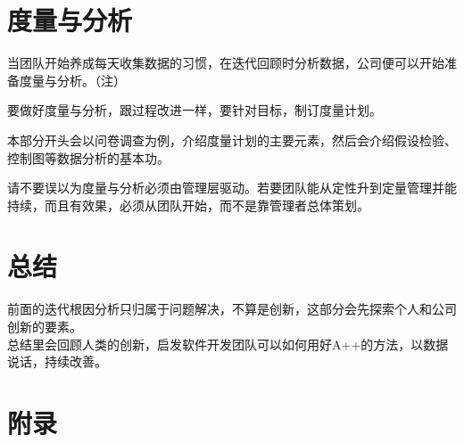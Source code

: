 \documentclass{book}        %
\begin{document}













\part{度量与分析}当团队开始养成每天收集数据的习惯，在迭代回顾时分析数据，公司便可以开始准备度量与分析。（注）

要做好度量与分析，跟过程改进一样，要针对目标，制订度量计划。

本部分开头会以问卷调查为例，介绍度量计划的主要元素，然后会介绍假设检验、控制图等数据分析的基本功。

请不要误以为度量与分析必须由管理层驱动。若要团队能从定性升到定量管理并能持续，而且有效果，必须从团队开始，而不是靠管理者总体策划。









\part{总结} 前面的迭代根因分析只归属于问题解决，不算是创新，这部分会先探索个人和公司创新的要素。\\
总结里会回顾人类的创新，启发软件开发团队可以如何用好A++的方法，以数据说话，持续改善。\\







\part{附录}



%
\end{document}
